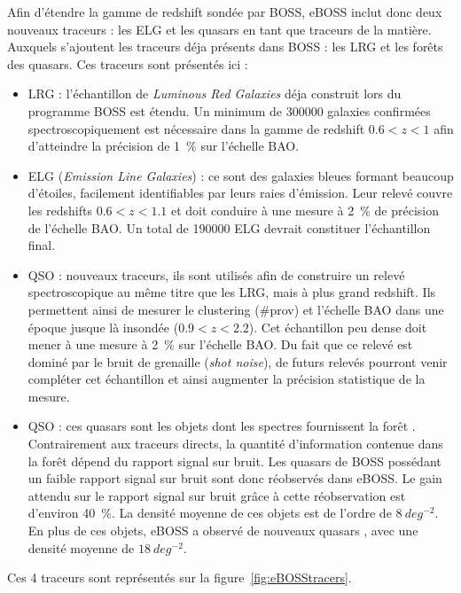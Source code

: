 \documentclass[11pt, twoside, a4paper, openright]{report}
\begin{document}
Afin d'étendre la gamme de redshift sondée par BOSS, eBOSS inclut donc deux nouveaux traceurs : les ELG et les quasars en tant que traceurs de la matière. Auxquels s'ajoutent les traceurs déja présents dans BOSS : les LRG et les forêts \lya{} des quasars. Ces traceurs sont présentés ici :
\begin{itemize}
\item LRG : l'échantillon de \emph{Luminous Red Galaxies} déja construit lors du programme BOSS est étendu. Un minimum de \num{300000} galaxies confirmées spectroscopiquement est nécessaire dans la gamme de redshift $\num{0,6} < z < \num{1}$ afin d'atteindre la précision de \SI{1}{\percent} sur l'échelle BAO.
\item ELG (\emph{Emission Line Galaxies}) : ce sont des galaxies bleues formant beaucoup d'étoiles, facilement identifiables par leurs raies d'émission. Leur relevé couvre les redshifts $\num{0,6} < z < \num{1,1}$ et doit conduire à une mesure à \SI{2}{\percent} de précision de l'échelle BAO. Un total de \num{190000} ELG devrait constituer l'échantillon final.
\item QSO : nouveaux traceurs, ils sont utilisés afin de construire un relevé spectroscopique au même titre que les LRG, mais à plus grand redshift. Ils permettent ainsi de mesurer le clustering (\#prov) et l'échelle BAO dans une époque jusque là insondée ($\num{0,9} < z < \num{2,2}$). Cet échantillon peu dense doit mener à une mesure à \SI{2}{\percent} sur l'échelle BAO. Du fait que ce relevé est dominé par le bruit de grenaille (\emph{shot noise}), de futurs relevés pourront venir compléter cet échantillon et ainsi augmenter la précision statistique de la mesure.
\item \lya{} QSO : ces quasars sont les objets dont les spectres fournissent la forêt \lya{}. Contrairement aux traceurs directs, la quantité d'information contenue dans la forêt \lya{} dépend du rapport signal sur bruit. Les quasars \lya{} de BOSS possédant un faible rapport signal sur bruit sont donc réobservés dans eBOSS. Le gain attendu sur le rapport signal sur bruit grâce à cette réobservation est d'environ \SI{40}{\percent}. La densité moyenne de ces objets est de l'ordre de $\SI{8}{deg^{-2}}$. \\
  En plus de ces objets, eBOSS a observé de nouveaux quasars \lya{}, avec une densité moyenne de $\SI{18}{deg^{-2}}$.
\end{itemize}
Ces 4 traceurs sont représentés sur la figure~\ref{fig:eBOSStracers}.
\end{document}
